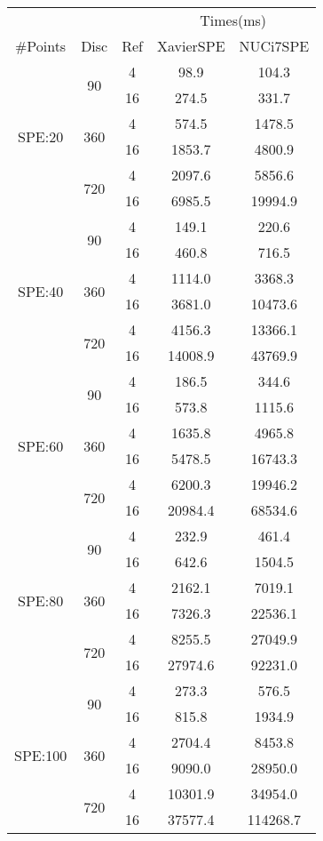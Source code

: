 \begin{center}
\begin{tabular}{c|c|c|c|c}
	&&&\multicolumn{2}{c}{Times(ms)}\\
	\#Points&Disc&Ref&XavierSPE&NUCi7SPE\\
\hline
	\multirow{6}{*}{SPE:20}&\multirow{2}{*}{90}&4&98.9&104.3\\
			&&16&274.5&331.7\\
		&\multirow{2}{*}{360}&4&574.5&1478.5\\
			&&16&1853.7&4800.9\\
		&\multirow{2}{*}{720}&4&2097.6&5856.6\\
			&&16&6985.5&19994.9\\

\hline
	\multirow{6}{*}{SPE:40}&\multirow{2}{*}{90}&4&149.1&220.6\\
			&&16&460.8&716.5\\
		&\multirow{2}{*}{360}&4&1114.0&3368.3\\
			&&16&3681.0&10473.6\\
		&\multirow{2}{*}{720}&4&4156.3&13366.1\\
			&&16&14008.9&43769.9\\

\hline
	\multirow{6}{*}{SPE:60}&\multirow{2}{*}{90}&4&186.5&344.6\\
			&&16&573.8&1115.6\\
		&\multirow{2}{*}{360}&4&1635.8&4965.8\\
			&&16&5478.5&16743.3\\
		&\multirow{2}{*}{720}&4&6200.3&19946.2\\
			&&16&20984.4&68534.6\\

\hline
	\multirow{6}{*}{SPE:80}&\multirow{2}{*}{90}&4&232.9&461.4\\
			&&16&642.6&1504.5\\
		&\multirow{2}{*}{360}&4&2162.1&7019.1\\
			&&16&7326.3&22536.1\\
		&\multirow{2}{*}{720}&4&8255.5&27049.9\\
			&&16&27974.6&92231.0\\

\hline
	\multirow{6}{*}{SPE:100}&\multirow{2}{*}{90}&4&273.3&576.5\\
			&&16&815.8&1934.9\\
		&\multirow{2}{*}{360}&4&2704.4&8453.8\\
			&&16&9090.0&28950.0\\
		&\multirow{2}{*}{720}&4&10301.9&34954.0\\
			&&16&37577.4&114268.7\\

\hline
\end{tabular}
\end{center}







